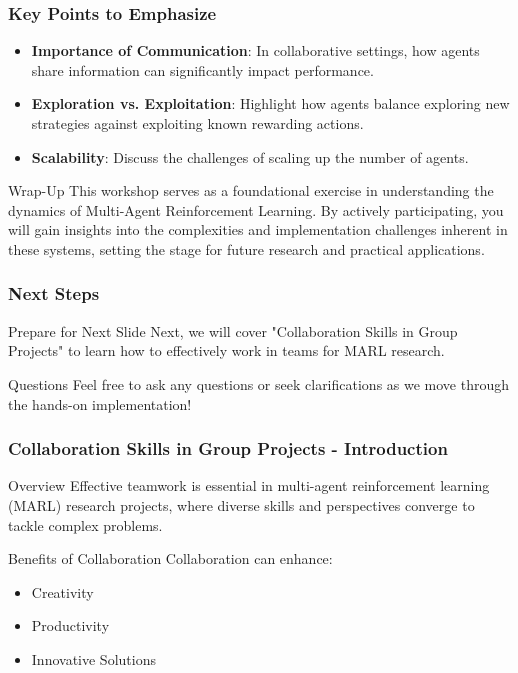 \documentclass[aspectratio=169]{beamer}
\begin{document}
\begin{frame}[fragile]
    \frametitle{Key Points to Emphasize}
    
    \begin{itemize}
        \item \textbf{Importance of Communication}: In collaborative settings, how agents share information can significantly impact performance.
        \item \textbf{Exploration vs. Exploitation}: Highlight how agents balance exploring new strategies against exploiting known rewarding actions.
        \item \textbf{Scalability}: Discuss the challenges of scaling up the number of agents.
    \end{itemize}
    
    \begin{block}{Wrap-Up}
        This workshop serves as a foundational exercise in understanding the dynamics of Multi-Agent Reinforcement Learning. By actively participating, you will gain insights into the complexities and implementation challenges inherent in these systems, setting the stage for future research and practical applications.
    \end{block}
\end{frame}

\begin{frame}[fragile]
    \frametitle{Next Steps}
    
    \begin{block}{Prepare for Next Slide}
        Next, we will cover "Collaboration Skills in Group Projects" to learn how to effectively work in teams for MARL research.
    \end{block}
    
    \begin{block}{Questions}
        Feel free to ask any questions or seek clarifications as we move through the hands-on implementation!
    \end{block}
\end{frame}

\begin{frame}[fragile]
    \frametitle{Collaboration Skills in Group Projects - Introduction}
    \begin{block}{Overview}
        Effective teamwork is essential in multi-agent reinforcement learning (MARL) research projects, where diverse skills and perspectives converge to tackle complex problems.
    \end{block}
    \begin{block}{Benefits of Collaboration}
        Collaboration can enhance:
        \begin{itemize}
            \item Creativity
            \item Productivity
            \item Innovative Solutions
        \end{itemize}
    \end{block}
\end{frame}
\end{document}
